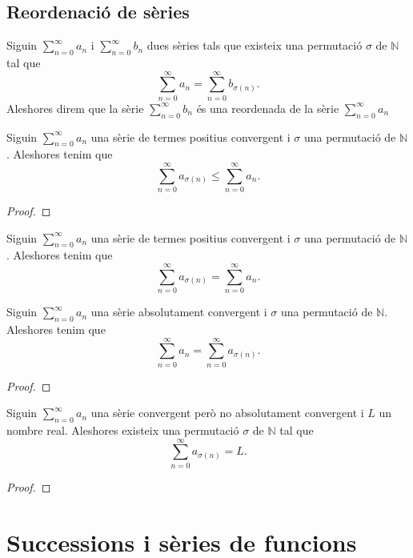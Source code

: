 \documentclass[../Apunts.tex]{subfiles}
\begin{document}
	\subsection{Reordenació de sèries}
	\begin{definition}
		\label{def:reordenada d'una sèrie}
		Siguin \(\sum_{n=0}^{\infty}a_{n}\) i \(\sum_{n=0}^{\infty}b_{n}\) dues sèries tals que existeix una permutació \(\sigma\) de \(\mathbb{N}\) tal que
		\[\sum_{n=0}^{\infty}a_{n}=\sum_{n=0}^{\infty}b_{\sigma(n)}.\]
		Aleshores direm que la sèrie \(\sum_{n=0}^{\infty}b_{n}\) és una reordenada de la sèrie \(\sum_{n=0}^{\infty}a_{n}\)
	\end{definition}
	\begin{lemma}
		Siguin \(\sum_{n=0}^{\infty}a_{n}\) una sèrie de termes positius convergent i \(\sigma\) una permutació de \(\mathbb{N}\). Aleshores tenim que
		\[\sum_{n=0}^{\infty}a_{\sigma(n)}\leq\sum_{n=0}^{\infty}a_{n}.\]
		\begin{proof}
		\end{proof}
	\end{lemma}
	\begin{corollary}
		Siguin \(\sum_{n=0}^{\infty}a_{n}\) una sèrie de termes positius convergent i \(\sigma\) una permutació de \(\mathbb{N}\). Aleshores tenim que
		\[\sum_{n=0}^{\infty}a_{\sigma(n)}=\sum_{n=0}^{\infty}a_{n}.\]
	\end{corollary}
	\begin{lemma}
		Siguin \(\sum_{n=0}^{\infty}a_{n}\) una sèrie absolutament convergent i \(\sigma\) una permutació de \(\mathbb{N}\). Aleshores tenim que
		\[\sum_{n=0}^{\infty}a_{n}=\sum_{n=0}^{\infty}a_{\sigma(n)}.\]
		\begin{proof}
		\end{proof}
	\end{lemma}
	\begin{theorem}
		\label{thm:Teorema de la reordenació de sèries de Riemann}
		Siguin \(\sum_{n=0}^{\infty}a_{n}\) una sèrie convergent però no absolutament convergent i \(L\) un nombre real. Aleshores existeix una permutació \(\sigma\) de \(\mathbb{N}\) tal que
		\[\sum_{n=0}^{\infty}a_{\sigma(n)}=L.\]
		\begin{proof}
		\end{proof}
	\end{theorem}
	\section{Successions i sèries de funcions}
\end{document}
